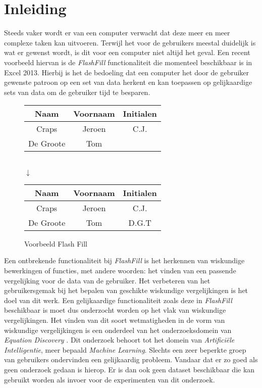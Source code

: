 \documentclass[Main.tex]{subfiles}
\begin{document}
\section{Inleiding}
Steeds vaker wordt er van een computer verwacht dat deze meer en meer complexe taken kan uitvoeren. Terwijl het voor de gebruikers meestal duidelijk is wat er gewenst wordt, is dit voor een computer niet altijd het geval. Een recent voorbeeld hiervan is de \textit{FlashFill} \cite{flashFill} functionaliteit die momenteel beschikbaar is in Excel 2013. Hierbij is het de bedoeling dat een computer het door de gebruiker gewenste patroon op een set van data herkent en kan toepassen op gelijkaardige sets van data om de gebruiker tijd te besparen.

\begin{figure}[!htb]
\centering
\begin{framed}
\begin{tabular}{| c | c | c |}
\hline
Naam & Voornaam & Initialen \\ \hline
Craps & Jeroen & C.J. \\ \hline
De Groote & Tom &  \\ \hline
\end{tabular} \\
$\downarrow$ \\
\begin{tabular}{| c | c | c |}
\hline
Naam & Voornaam & Initialen \\ \hline
Craps & Jeroen & C.J. \\ \hline
De Groote & Tom &  D.G.T \\ \hline
\end{tabular}
\end{framed}
\caption{Voorbeeld Flash Fill}
\label{fig:flashfill}
\end{figure}

\par Een ontbrekende functionaliteit bij \textit{FlashFill} is het herkennen van wiskundige bewerkingen of functies, met andere woorden: het vinden van een passende vergelijking voor de data van de gebruiker. Het verbeteren van het gebruikersgemak bij het bepalen van geschikte wiskundige vergelijkingen is het doel van dit werk. Een gelijkaardige functionaliteit zoals deze in \textit{FlashFill}  beschikbaar is moet dus onderzocht worden op het vlak van wiskundige vergelijkingen. Het vinden van dit soort wetmatigheden in de vorm van wiskundige vergelijkingen is een onderdeel van het onderzoeksdomein van \textit{Equation Discovery} \cite{equationDisc}. Dit onderzoek behoort tot het domein van \textit{Artifici\"ele Intelligentie}, meer bepaald \textit{Machine Learning}. Slechts een zeer beperkte groep van gebruikers ondervinden een gelijkaardig probleem. Vandaar dat er zo goed als geen onderzoek gedaan is hierop. Er is dan ook geen dataset beschikbaar die kan gebruikt worden als invoer voor de experimenten van dit onderzoek.  \par
\end{document}
